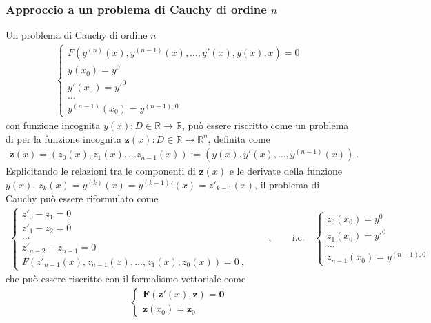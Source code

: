\documentclass[letterpaper,10pt,english]{jupyterBook}
\begin{document}
\subsubsection{Approccio a un problema di Cauchy di ordine \protect\(n\protect\)}
\label{\detokenize{ch/numerics/ode-cauchy:approccio-a-un-problema-di-cauchy-di-ordine-n}}
\sphinxAtStartPar
Un problema di Cauchy di ordine \(n\)
\begin{equation*}
\begin{split}\begin{cases}
  F(y^{(n)}(x), y^{(n-1)}(x), \dots, y'(x), y(x), x) = 0 \\
  y(x_0) = y^0 \\
  y'(x_0) = y'^0 \\
  \dots \\
  y^{(n-1)}(x_0) = y^{(n-1),0}
\end{cases}\end{split}
\end{equation*}
\sphinxAtStartPar
con funzione incognita \(y(x): D \in \mathbb{R} \rightarrow \mathbb{R}\), può essere riscritto come un problema di  per la funzione incognita \(\mathbf{z}(x): D \in \mathbb{R} \rightarrow \mathbb{R}^n\), definita come
\begin{equation*}
\begin{split}\mathbf{z}(x) = (z_0(x), z_1(x), \dots z_{n-1}(x)) := (y(x), y'(x), \dots, y^{(n-1)}(x)) \ .\end{split}
\end{equation*}
\sphinxAtStartPar
Esplicitando le relazioni tra le componenti di \(\mathbf{z}(x)\) e le derivate della funzione \(y(x)\), \(z_{k}(x) = y^{(k)}(x) = {y^{(k-1)}}'(x) = z'_{k-1}(x)\), il problema di Cauchy può essere riformulato come
\begin{equation*}
\begin{split}\begin{cases}
z'_0 - z_1 = 0 \\
z'_1 - z_2 = 0 \\
\dots \\
z'_{n-2} - z_{n-1} = 0 \\
F(z'_{n-1}(x), z_{n-1}(x), \dots, z_1(x), z_0(x)) = 0 \ ,
\end{cases}
\qquad , \qquad
\text{i.c.} \quad
\begin{cases}
z_0(x_0) = y^0 \\
z_1(x_0) = y'^0 \\
\dots \\
z_{n-1}(x_0) = y^{(n-1),0}
\end{cases}
\end{split}
\end{equation*}
\sphinxAtStartPar
che può essere riscritto con il formalismo vettoriale come
\begin{equation*}
\begin{split}\begin{cases}
  \mathbf{F}(\mathbf{z}'(x), \mathbf{z}) = \mathbf{0} \\
  \mathbf{z}(x_0) = \mathbf{z}_0
\end{cases}\end{split}
\end{equation*}
\end{document}
